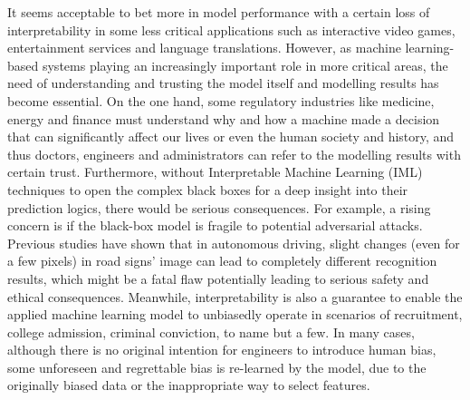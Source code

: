 \documentclass[11pt]{article}
\begin{document}
It seems acceptable to bet more in model performance with a certain loss of interpretability in some less critical applications such as interactive video games, entertainment services and language translations. However, as machine learning-based systems playing an increasingly important role in more critical areas, the need of understanding and trusting the model itself and modelling results has become essential\citep{mi2020review}. On the one hand, some regulatory industries like medicine, energy and finance must understand why and how a machine made a decision that can significantly affect our lives or even the human society and history\citep{hall2019introduction}, and thus doctors, engineers and administrators can refer to the modelling results with certain trust. Furthermore, without Interpretable Machine Learning (IML) techniques to open the complex black boxes for a deep insight into their prediction logics, there would be serious consequences. For example, a rising concern is if the black-box model is fragile to potential adversarial attacks. Previous studies have shown that in autonomous driving, slight changes (even for a few pixels) in road signs’ image can lead to completely different recognition results\citep{deng2020analysis}, which might be a fatal flaw potentially leading to serious safety and ethical consequences. Meanwhile, interpretability is also a guarantee to enable the applied machine learning model to unbiasedly operate in scenarios of recruitment, college admission, criminal conviction, to name but a few\citep{hall2019introduction}. In many cases, although there is no original intention for engineers to introduce human bias, some unforeseen and regrettable bias is re-learned by the model, due to the originally biased data or the inappropriate way to select features.
\end{document}
